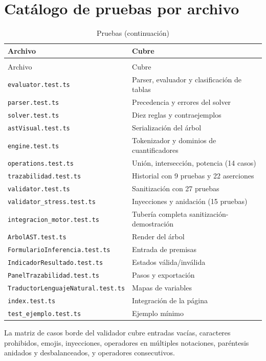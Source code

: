 \documentclass[11pt,a4paper,openany]{book}
\begin{document}
\chapter{Cat\'alogo de pruebas por archivo}
\label{ch:tests}
\begin{longtable}{ll}
\caption{Archivos de prueba y cobertura} \\
\toprule
Archivo & Cubre \\
\midrule
\endfirsthead
\caption{Pruebas (continuaci\'on)} \\
\toprule
Archivo & Cubre \\
\midrule
\endhead
\texttt{evaluator.test.ts} & Parser, evaluador y clasificaci\'on de tablas \\
\texttt{parser.test.ts} & Precedencia y errores del solver \\
\texttt{solver.test.ts} & Diez reglas y contraejemplos \\
\texttt{astVisual.test.ts} & Serializaci\'on del \'arbol \\
\texttt{engine.test.ts} & Tokenizador y dominios de cuantificadores \\
\texttt{operations.test.ts} & Uni\'on, intersecci\'on, potencia (14 casos) \\
\texttt{trazabilidad.test.ts} & Historial con 9 pruebas y 22 aserciones \\
\texttt{validator.test.ts} & Sanitizaci\'on con 27 pruebas \\
\texttt{validator\_stress.test.ts} & Inyecciones y anidaci\'on (15 pruebas) \\
\texttt{integracion\_motor.test.ts} & Tuber\'ia completa sanitizaci\'on-demostraci\'on \\
\texttt{ArbolAST.test.ts} & Render del \'arbol \\
\texttt{FormularioInferencia.test.ts} & Entrada de premisas \\
\texttt{IndicadorResultado.test.ts} & Estados v\'alida/inv\'alida \\
\texttt{PanelTrazabilidad.test.ts} & Pasos y exportaci\'on \\
\texttt{TraductorLenguajeNatural.test.ts} & Mapas de variables \\
\texttt{index.test.ts} & Integraci\'on de la p\'agina \\
\texttt{test\_ejemplo.test.ts} & Ejemplo m\'inimo \\
\bottomrule
\end{longtable}
La matriz de casos borde del validador cubre entradas vac\'ias, caracteres prohibidos, emojis, inyecciones, operadores en m\'ultiples notaciones, par\'entesis anidados y desbalanceados, y operadores consecutivos.
\end{document}
